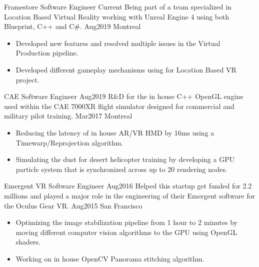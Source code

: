 %
%
%

\begin{experiences}
  \experience
    {Framestore}   			{Software Engineer}
    {Current} 			{Being part of a team specialized in Location Based Virtual Reality working with Unreal Engine 4 using both Blueprint, C++ and C\#.}
	{Aug2019}	 	
	{Montreal}			{
						  \begin{itemize}
							\item Developed new features and resolved multiple issues in the Virtual Production pipeline.
							\item Developed different gameplay mechanisms using for Location Based VR project.
						  \end{itemize}
						 }
   \emptySeparator

  \experience
    {CAE}   				{Software Engineer}
    {Aug2019} 			{R\&D for the in house C++ OpenGL engine used within the CAE 7000XR flight simulator designed for commercial and military pilot training.}
	{Mar2017}	 	
	{Montreal}			{
						  \begin{itemize}
							\item Reducing the latency of in house AR/VR HMD by 16ms using a Timewarp/Reprojection algorithm.
							\item Simulating the dust for desert helicopter training by developing a GPU particle system that is synchronized across up to 20 rendering nodes.
						  \end{itemize}
						 }
   \emptySeparator
   
   \experience
    {Emergent VR} 			{Software Engineer}
    {Aug2016} 				{Helped this startup get funded for 2.2 millions and played a major role in the engineering of their Emergent software for the Oculus Gear VR.}
	{Aug2015}	 	
	{San Francisco}			{
						  \begin{itemize}
							\item Optimizing the image stabilization pipeline from 1 hour to 2 minutes by moving different computer vision algorithms to the GPU using OpenGL shaders.
							\item Working on in house OpenCV Panorama stitching algorithm.
						  \end{itemize}
						 }
   \emptySeparator
   

\end{experiences}
